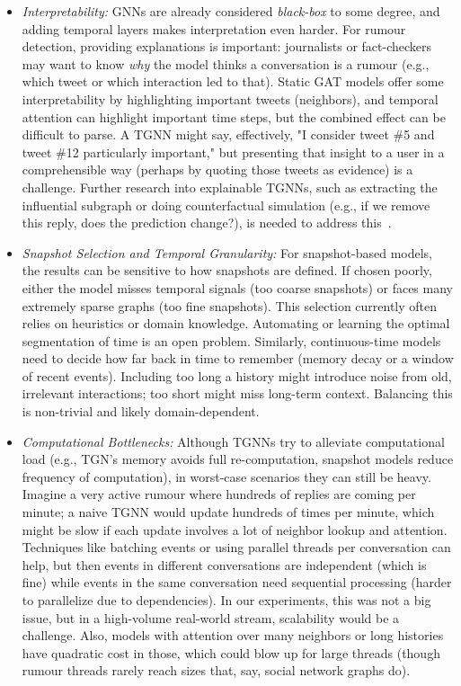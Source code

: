 \documentclass{cshonours}
\begin{document}
\begin{itemize}
\item \emph{Interpretability:} GNNs are already considered \textit{black-box} to some degree, and adding temporal layers makes interpretation even harder. For rumour detection, providing explanations is important: journalists or fact-checkers may want to know \textit{why} the model thinks a conversation is a rumour (e.g., which tweet or which interaction led to that). Static GAT models offer some interpretability by highlighting important tweets (neighbors), and temporal attention can highlight important time steps, but the combined effect can be difficult to parse. A TGNN might say, effectively, "I consider tweet \#5 and tweet \#12 particularly important," but presenting that insight to a user in a comprehensible way (perhaps by quoting those tweets as evidence) is a challenge. Further research into explainable TGNNs, such as extracting the influential subgraph or doing counterfactual simulation (e.g., if we remove this reply, does the prediction change?), is needed to address this~\cite{Focal2025Understanding}.

\item \emph{Snapshot Selection and Temporal Granularity:} For snapshot-based models, the results can be sensitive to how snapshots are defined. If chosen poorly, either the model misses temporal signals (too coarse snapshots) or faces many extremely sparse graphs (too fine snapshots). This selection currently often relies on heuristics or domain knowledge. Automating or learning the optimal segmentation of time is an open problem. Similarly, continuous-time models need to decide how far back in time to remember (memory decay or a window of recent events). Including too long a history might introduce noise from old, irrelevant interactions; too short might miss long-term context. Balancing this is non-trivial and likely domain-dependent.

\item \emph{Computational Bottlenecks:} Although TGNNs try to alleviate computational load (e.g., TGN's memory avoids full re-computation, snapshot models reduce frequency of computation), in worst-case scenarios they can still be heavy. Imagine a very active rumour where hundreds of replies are coming per minute; a naive TGNN would update hundreds of times per minute, which might be slow if each update involves a lot of neighbor lookup and attention. Techniques like batching events or using parallel threads per conversation can help, but then events in different conversations are independent (which is fine) while events in the same conversation need sequential processing (harder to parallelize due to dependencies). In our experiments, this was not a big issue, but in a high-volume real-world stream, scalability would be a challenge. Also, models with attention over many neighbors or long histories have quadratic cost in those, which could blow up for large threads (though rumour threads rarely reach sizes that, say, social network graphs do).


\end{itemize}
\end{document}
